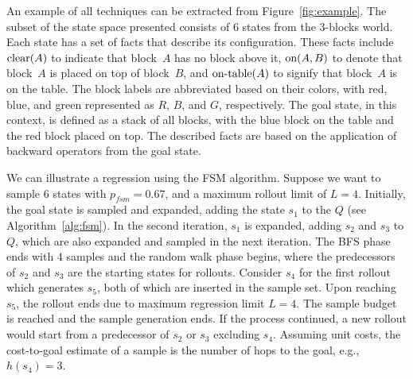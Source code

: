 \begin{figure}[ht]
\end{figure}

An example of all techniques can be extracted from Figure~\ref{fig:example}. The subset of the state space presented consists of $6$ states from the $3$-blocks world. Each state has a set of facts that describe its configuration. These facts include $\text{clear}(A)$ to indicate that block~$A$ has no block above it, $\text{on}(A,B)$ to denote that block~$A$ is placed on top of block~$B$, and $\text{on-table}(A)$ to signify that block~$A$ is on the table. The block labels are abbreviated based on their colors, with red, blue, and green represented as $R$, $B$, and $G$, respectively. The goal state, in this context, is defined as a stack of all blocks, with the blue block on the table and the red block placed on top. The described facts are based on the application of backward operators from the goal state.

We can illustrate a regression using the FSM algorithm. Suppose we want to sample $6$ states with $p_{fsm}=0.67$, and a maximum rollout limit of $L=4$. Initially, the goal state is sampled and expanded, adding the state $s_1$ to the $Q$ (see Algorithm~\ref{alg:fsm}). In the second iteration, $s_1$ is expanded, adding $s_2$ and $s_3$ to $Q$, which are also expanded and sampled in the next iteration. The BFS phase ends with $4$ samples and the random walk phase begins, where the predecessors of $s_2$ and $s_3$ are the starting states for rollouts. Consider $s_4$ for the first rollout which generates $s_5$, both of which are inserted in the sample set. Upon reaching $s_5$, the rollout ends due to maximum regression limit $L = 4$. The sample budget is reached and the sample generation ends. If the process continued, a new rollout would start from a predecessor of $s_2$ or $s_3$ excluding $s_4$. Assuming unit costs, the cost-to-goal estimate of a sample is the number of hops to the goal, e.g., $h(s_4)=3$.

